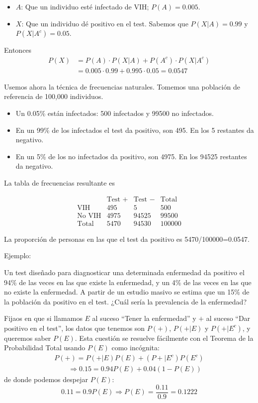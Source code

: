 \documentclass[
  spanish,
  letterpaper,
  DIV=11,
  numbers=noendperiod]{scrreprt}
\begin{document}
\begin{tcolorbox}
\begin{itemize}
\item
  \(A\): Que un individuo esté infectado de VIH; \(P(A)=0.005\).
\item
  \(X\): Que un individuo dé positivo en el test. Sabemos que
  \(P(X|A)=0.99\) y \(P(X|A^c)= 0.05\).
\end{itemize}

Entonces \[
\begin{array}{rl}
P(X) \!\!\!\!   &  =P(A)\cdot P(X|A)+P(A^c)\cdot P(X|A^c) \\
&=0.005\cdot 0.99+0.995\cdot 0.05=0.0547
\end{array}
\]

Usemos ahora la técnica de frecuencias naturales. Tomemos una población
de referencia de 100,000 individuos.

\begin{itemize}
\item
  Un 0.05\% están infectados: 500 infectados y 99500 no infectados.
\item
  En un 99\% de los infectados el test da positivo, son 495. En los 5
  restantes da negativo.
\item
  En un 5\% de los no infectados da positivo, son 4975. En los 94525
  restantes da negativo.
\end{itemize}

La tabla de frecuencias resultante es

\[
\begin{array}{l|c|c|c}
& \text{Test }+ & \text{Test }- & \text{Total}\\
\hline
\text{VIH} & 495 & 5 & 500\\ \hline
\text{No VIH} & 4975& 94525 & 99500\\\hline
\text{Total} &5470 & 94530&  100000
\end{array}
\]

La proporción de personas en las que el test da positivo es
5470/100000=0.0547.

Ejemplo:

Un test diseñado para diagnosticar una determinada enfermedad da
positivo el 94\% de las veces en las que existe la enfermedad, y un 4\%
de las veces en las que no existe la enfermedad. A partir de un estudio
masivo se estima que un 15\% de la población da positivo en el test.
¿Cuál sería la prevalencia de la enfermedad?

Fijaos en que si llamamos \(E\) al suceso ``Tener la enfermedad'' y
\(+\) al suceso ``Dar positivo en el test'', los datos que tenemos son
\(P(+)\), \(P(+|E)\) y \(P(+|E^c)\), y queremos saber \(P(E)\). Esta
cuestión se resuelve fácilmente con el Teorema de la Probabilidad Total
usando \(P(E)\) como incógnita: \[
  \begin{array}{l}
P(+)=P(+|E)P(E)+(P+|E^c)P(E^c) \\
\qquad\Longrightarrow 
0.15 =0.94 P(E)+0.04(1-P(E))
\end{array}
\] de donde podemos despejar \(P(E)\): \[
0.11=0.9P(E)\Rightarrow P(E)=\frac{0.11}{0.9}=0.1222
\]


\end{tcolorbox}
\end{document}

